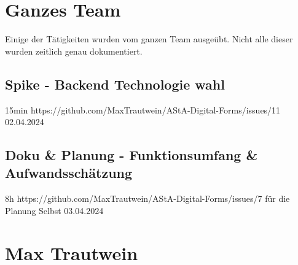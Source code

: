 \section{Ganzes Team}
Einige der Tätigkeiten wurden vom ganzen Team ausgeübt.
Nicht alle dieser wurden zeitlich genau dokumentiert.

\subsection{Spike - Backend Technologie wahl }
15min
https://github.com/MaxTrautwein/AStA-Digital-Forms/issues/11
02.04.2024

\subsection{Doku & Planung - Funktionsumfang & Aufwandsschätzung}
8h
https://github.com/MaxTrautwein/AStA-Digital-Forms/issues/7
für die Planung Selbst
03.04.2024

\section{Max Trautwein}\label{sec:max-trautwein}

